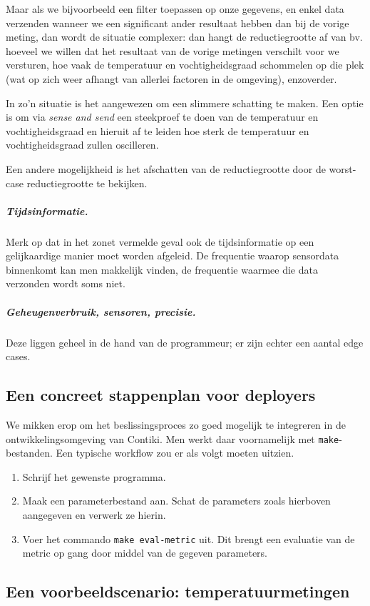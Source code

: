 \documentclass{article}
\begin{document}
Maar als we bijvoorbeeld een filter toepassen op onze gegevens, en enkel data
verzenden wanneer we een significant ander resultaat hebben dan bij de vorige
meting, dan wordt de situatie complexer: dan hangt de reductiegrootte af van
bv. hoeveel we willen dat het resultaat van de vorige metingen verschilt voor we
versturen, hoe vaak de temperatuur en vochtigheidsgraad schommelen op die plek
(wat op zich weer afhangt van allerlei factoren in de omgeving), enzoverder.

In zo'n situatie is het aangewezen om een slimmere schatting te maken. Een optie
is om via \textit{sense and send} een steekproef te doen van de temperatuur en
vochtigheidsgraad en hieruit af te leiden hoe sterk de temperatuur en
vochtigheidsgraad zullen oscilleren.

Een andere mogelijkheid is het afschatten van de reductiegrootte door de
worst-case reductiegrootte te bekijken.

\subparagraph{Tijdsinformatie.} Merk op dat in het zonet vermelde geval ook de
tijdsinformatie op een gelijkaardige manier moet worden afgeleid. De frequentie
waarop sensordata binnenkomt kan men makkelijk vinden, de frequentie waarmee die
data verzonden wordt soms niet. 

\subparagraph{Geheugenverbruik, sensoren, precisie.} Deze liggen geheel in de
hand van de programmeur; er zijn echter een aantal edge cases. 

\subsection{Een concreet stappenplan voor deployers}
We mikken erop om het beslissingsproces zo goed mogelijk te integreren in
de ontwikkelingsomgeving van Contiki. Men werkt daar voornamelijk met
\texttt{make}-bestanden. Een typische workflow zou er als volgt moeten uitzien.

\begin{enumerate}
\item Schrijf het gewenste programma.
\item Maak een parameterbestand aan. Schat de parameters zoals hierboven
aangegeven en verwerk ze hierin.
\item Voer het commando \texttt{make eval-metric} uit. Dit brengt een evaluatie
van de metric op gang door middel van de gegeven parameters.
\end{enumerate}

\subsection{Een voorbeeldscenario: temperatuurmetingen}
\end{document}
